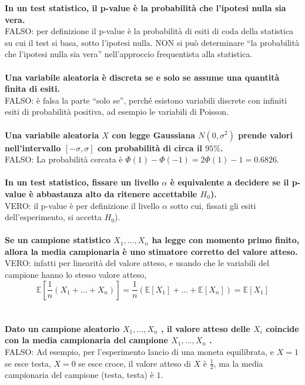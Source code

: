 \noindent \textbf{In un test statistico, il p-value è la probabilità che l’ipotesi nulla sia vera.}\\
FALSO: per definizione il p-value è la probabilità di esiti di coda della statistica su cui il test si basa, sotto l’ipotesi nulla. NON si può determinare “la probabilità che l’ipotesi nulla sia vera” nell'approccio frequentista alla statistica.\\\\

\noindent \textbf{Una variabile aleatoria è discreta se e solo se assume una quantità finita di esiti.}\\
FALSO: è falsa la parte “solo se”, perché esistono variabili discrete con infiniti esiti di probabilità positiva, ad esempio le variabili di Poisson. \\\\

\noindent \textbf{Una variabile aleatoria $X$ con legge Gaussiana $N(0, \sigma^2)$ prende valori nell'intervallo $[-\sigma, \sigma]$ con probabilità di circa il $95\%$.} \\
FALSO: La probabilità cercata è $\Phi(1) - \Phi(-1) = 2\Phi(1) - 1 = 0.6826$.\\\\

\noindent\textbf{In un test statistico, fissare un livello $\alpha$ è equivalente a decidere se il p-value è abbastanza alto da ritenere accettabile $H_0$).}\\
VERO: il p-value è per definizione il livello $\alpha$ sotto cui, fissati gli esiti dell'esperimento, si accetta $H_0$).\\\\

\noindent\textbf{Se un campione statistico $X_1, \ldots, X_n$ ha legge con momento primo finito, allora la media campionaria è uno stimatore corretto del valore atteso.}\\
VERO: infatti per linearità del valore atteso, e usando che le variabili del campione hanno lo stesso valore atteso,
\begin{equation*}
	\mathbb{E}[\frac{1}{n}(X_1 + \ldots + X_n)] = \frac{1}{n}(\mathbb{E}[X_1] + \ldots + \mathbb{E}[X_n]) = \mathbb{E}[X_1]
\end{equation*}\\\\

\noindent \textbf{Dato un campione aleatorio $X_1 ,\ldots, X_n$ , il valore atteso delle $X_i$ coincide con la media campionaria del campione $X_1 ,\ldots, X_n$ .}\\
FALSO: Ad esempio, per l’esperimento lancio di una moneta equilibrata, e $X = 1$ se esce testa, $X = 0$ se esce croce, il valore atteso di $X$ è $\frac{1}{2}$, ma la media campionaria del campione (testa, testa) è $1$.\\\\

